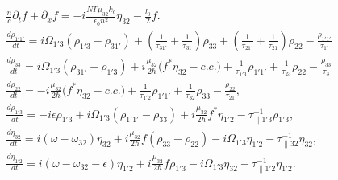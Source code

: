 \documentclass[10pt,letterpaper]{article}
\begin{document}
	\begin{subequations}
		\label{eq:threelevelmodel}
		\begin{align}
		&\frac{n}{c}\partial_t f + \partial_{x}f = -i\frac{N \Gamma \mu_{32} k_c}{\epsilon_0 n^2} \eta_{32} - \frac{l_0}{2} f \label{eq:rtwave} .\\
		&\frac{d \rho_{1'1'}}{d t} = i\Omega_{1'3} (\rho_{1'3} - \rho_{31'}) + (\frac{1}{\tau_{31'}} + \frac{1}{\tau_{31}})\rho_{33} 
		+ (\frac{1}{\tau_{21'}} + \frac{1}{\tau_{21}})\rho_{22} - \frac{\rho_{1'1'}}{\tau_{1'}} \\
		&\frac{d \rho_{33}}{d t} = i\Omega_{1'3} (\rho_{31'} - \rho_{1'3}) + i\frac{\mu_{32}}{2\hbar} \big (f^*\eta_{32}- c.c. \big )+ \frac{1}{\tau_{1'3}}\rho_{1'1'} +  \frac{1}{\tau_{23}}\rho_{22} - \frac{\rho_{33}}{\tau_{3}}  \\
		&\frac{d \rho_{22}}{d t}  = -i\frac{\mu_{32}}{2\hbar} \big (f^*\eta_{32} - c.c. \big ) + \frac{1}{\tau_{1'2}}\rho_{1'1'}  +  \frac{1}{\tau_{32}}\rho_{33} - \frac{\rho_{22}}{\tau_{21}} , \\
		&\frac{d \rho_{1'3}}{d t}  = -i\epsilon\rho_{1'3} +i \Omega_{1'3}(\rho_{1'1'} - \rho_{33}) +i\frac{\mu_{32}}{2 \hbar}f^*\eta_{1'2}-\tau_{\parallel 1'3}^{-1} \rho_{1'3},  \\
		&\frac{d \eta_{32}}{d t}   = i(\omega - \omega_{32})\eta_{32} +i \frac{\mu_{32}}{2\hbar}f(\rho_{33}-\rho_{22}) - i\Omega_{1'3}\eta_{1'2} - \tau_{\parallel 32}^{-1}\eta_{32}, \\
		&\frac{d \eta_{1'2}}{d t}  = i(\omega - \omega_{32}-\epsilon)\eta_{1'2} +i \frac{\mu_{32}}{2\hbar}f\rho_{1'3} - i\Omega_{1'3}\eta_{32} - \tau_{\parallel 1'2}^{-1}\eta_{1'2}.
		\end{align}
	\end{subequations}
	
	
	
	
	
	
\end{document}
